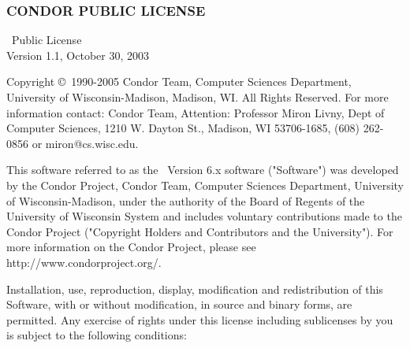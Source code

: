 \subsubsection*{\label{sec:condor-public-license}CONDOR PUBLIC LICENSE}

\begin{flushleft}
\CondorR\ Public License \\
Version 1.1, October 30, 2003
\end{flushleft}

Copyright \copyright\ 1990-2005 Condor Team, Computer Sciences Department,
University of Wisconsin-Madison, Madison, WI. All Rights Reserved.  For
more information contact: Condor Team, Attention: Professor Miron Livny,
Dept of Computer Sciences, 1210 W. Dayton St., Madison, WI 53706-1685, (608)
262-0856 or miron@cs.wisc.edu. 

This software referred to as the \CondorR\ Version 6.x software
("Software") was developed by the Condor Project, Condor Team,
Computer Sciences Department, University of Wisconsin-Madison, under
the authority of the Board of Regents of the  University of Wisconsin
System and includes voluntary contributions made to the Condor Project
("Copyright Holders and Contributors and the University").  For more
information on the Condor Project, please see
http://www.condorproject.org/.

Installation, use, reproduction, display, modification and
redistribution of this Software, with or without modification,  in
source and binary forms, are permitted.  Any exercise of rights under
this license including sublicenses by you is subject to the following
conditions:

